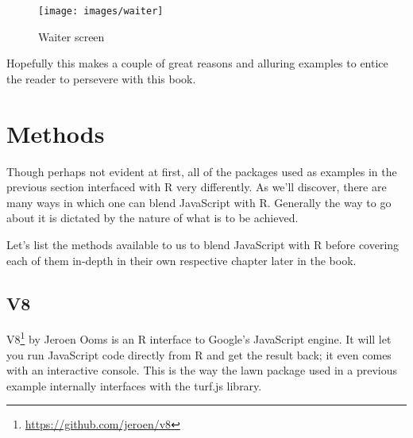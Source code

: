 \documentclass[
  10pt,
]{krantz}
\makeatletter
\newenvironment{Shaded}{\begin{snugshade}}{\end{snugshade}}
\newcommand{\CommentTok}[1]{\textcolor[rgb]{0.37,0.37,0.37}{\textit{#1}}}
\newcommand{\KeywordTok}[1]{\textcolor[rgb]{0.27,0.27,0.27}{\textbf{#1}}}
\newcommand{\NormalTok}[1]{#1}
\newcommand{\OperatorTok}[1]{\textcolor[rgb]{0.43,0.43,0.43}{\textbf{#1}}}
\newcommand{\StringTok}[1]{\textcolor[rgb]{0.5,0.5,0.5}{#1}}
\renewcommand{\href}[2]{#2\footnote{\url{#1}}}
\newenvironment{kframe}{%
\medskip{}
\setlength{\fboxsep}{.8em}
 \def\at@end@of@kframe{}%
 \ifinner\ifhmode%
  \def\at@end@of@kframe{\end{minipage}}%
  \begin{minipage}{\columnwidth}%
 \fi\fi%
 \def\FrameCommand##1{\hskip\@totalleftmargin \hskip-\fboxsep
 \colorbox{shadecolor}{##1}\hskip-\fboxsep
     \hskip-\linewidth \hskip-\@totalleftmargin \hskip\columnwidth}%
 \MakeFramed {\advance\hsize-\width
   \@totalleftmargin\z@ \linewidth\hsize
   \@setminipage}}%
 {\par\unskip\endMakeFramed%
 \at@end@of@kframe}
\renewenvironment{Shaded}{\begin{kframe}}{\end{kframe}}
\makeatother
\begin{document}
\begin{figure}[H]

{\centering \texttt{[image: images/waiter]} 

}

\caption{Waiter screen}\label{fig:intro-waiter}
\end{figure}

Hopefully this makes a couple of great reasons and alluring examples to entice the reader to persevere with this book.

\hypertarget{intro-methods}{%
\section{Methods}\label{intro-methods}}

Though perhaps not evident at first, all of the packages used as examples in the previous section interfaced with R very differently. As we'll discover, there are many ways in which one can blend JavaScript with R. Generally the way to go about it is dictated by the nature of what is to be achieved.

Let's list the methods available to us to blend JavaScript with R before covering each of them in-depth in their own respective chapter later in the book.

\hypertarget{intro-v8}{%
\subsection{V8}\label{intro-v8}}

\href{https://github.com/jeroen/v8}{V8} by Jeroen Ooms is an R interface to Google's JavaScript engine. It will let you run JavaScript code directly from R and get the result back; it even comes with an interactive console. This is the way the lawn package used in a previous example internally interfaces with the turf.js library.

\begin{Shaded}
\end{Shaded}
\end{document}
